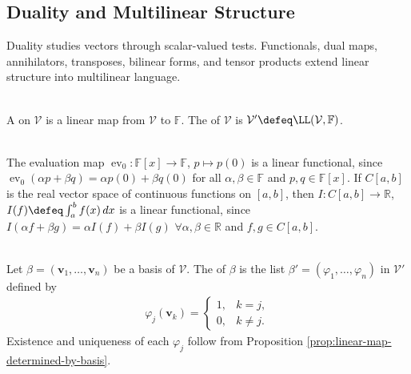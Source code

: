 \subsection{Duality and Multilinear Structure}

%

Duality studies vectors through scalar-valued tests. Functionals, dual maps, annihilators, transposes, bilinear forms, and tensor products extend linear structure into multilinear language.

\begin{definition} \\
A  on $\mathcal{V}$ is a linear map from $\mathcal{V}$ to $\mathbb{F}$. The  of $\mathcal{V}$ is $\mathcal{V}' \defeq \LL(\mathcal{V},\mathbb{F})$.
\end{definition}

\begin{example} \label{ex:evaluation-and-integral-functionals} \\
The evaluation map $\operatorname{ev}_0:\mathbb{F}[x]\to\mathbb{F}$, $p\mapsto p(0)$ is a linear functional, since $\operatorname{ev}_0(\alpha p+\beta q)=\alpha p(0)+\beta q(0)$ for all $\alpha,\beta\in\mathbb{F}$ and $p,q\in\mathbb{F}[x]$.
If $C[a,b]$ is the real vector space of continuous functions on $[a,b]$, then $I:C[a,b]\to\mathbb{R}$, $I(f)\defeq\int_a^b f(x)\,dx$ is a linear functional, since $I(\alpha f+\beta g)=\alpha I(f)+\beta I(g)$ $\forall \alpha,\beta\in\mathbb{R}$ and $f,g\in C[a,b]$.
\end{example}

\begin{definition} \\
Let $\beta=(\mathbf{v}_1,\ldots,\mathbf{v}_n)$ be a basis of $\mathcal{V}$. The  of $\beta$ is the list $\beta'=(\varphi_1,\ldots,\varphi_n)$ in $\mathcal{V}'$ defined by
\begin{align}
\varphi_j(\mathbf{v}_k)=
\begin{cases}
1, & k=j,\\
0, & k\neq j.
\end{cases}
\nonumber
\end{align}
Existence and uniqueness of each $\varphi_j$ follow from Proposition \ref{prop:linear-map-determined-by-basis}.
\end{definition}

